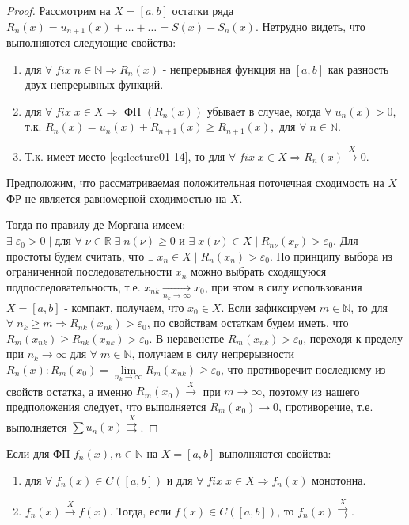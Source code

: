 \begin{proof}
	Рассмотрим на $X = [a,b]$ остатки ряда $R_n(x) = u_{n+1}(x) + \ldots + \ldots = S(x) - S_n(x)$.	Нетрудно видеть, что выполняются следующие свойства:
	\begin{enumerate}
		\item для $\forall \; fix \; n \in \mathbb{N} \Rightarrow R_n (x)$ - непрерывная функция на $[a,b]$ как разность двух непрерывных функций.
		\item для $\forall \; fix \; x \in X \Rightarrow$ $\text{ФП}$ $(R_n(x))$ убывает в случае, когда $\forall \; u_n (x) > 0$, т.к. \newline $R_n(x) = u_n(x) + R_{n+1}(x) \geqslant R_{n+1}(x), \text{ для } \forall \; n \in \mathbb{N}$.
		\item Т.к. имеет место \eqref{eq:lecture01-14}, то для $\forall \; fix \; x \in X \Rightarrow R_n(x) \overset{X}{\to} 0$.
	\end{enumerate}
	Предположим, что рассматриваемая положительная поточечная сходимость на $X$ ФР не является равномерной сходимостью на $X$.

	Тогда по правилу де Моргана имеем: $\exists \; \varepsilon_0 > 0 \; | \; \text{для } \forall \; \nu \in \mathbb{R} \; \exists \; n (\nu) \geqslant 0 \text{ и } \exists \; x (\nu) \in X \; | \; R_{n \nu} (x_\nu) > \varepsilon_0$. Для простоты будем считать, что $\exists \; x_n \in X \; | \; R_n (x_n) > \varepsilon_0$. По принципу выбора из ограниченной последовательности $x_n$ можно выбрать сходящуюся подпоследовательность, т.е. $x_{nk} \underset{n_k \to \infty}{\longrightarrow} x_0$, при этом в силу использования $X = [a,b]$ - компакт, получаем, что $x_0 \in X$. Если зафиксируем $m \in \mathbb{N}$, то для $\forall \; n_k \geqslant m \Rightarrow R_{nk} 	(x_{nk}) > \varepsilon_0$, по свойствам остаткам будем иметь, что $R_{m} (x_{nk}) \geqslant R_{nk} (x_{nk}) > \varepsilon_0$. В неравенстве $R_m (x_{nk}) > \varepsilon_0$, переходя к пределу при $n_k \to \infty \; \text{для } \forall \; m \in \mathbb{N}$, получаем в силу непрерывности $R_n(x): R_m (x_0) = \lim\limits_{n_k \to \infty} R_m(x_{nk}) \geqslant \varepsilon_0$, что противоречит последнему из свойств остатка, а именно $R_m(x_0) \overset{X}{\longrightarrow}$ при $m \to \infty$, поэтому из нашего предположения следует, что выполняется $R_m(x_0) \to 0$, противоречие, т.е. выполняется $\sum u_n(x) \overset{X}{\rightrightarrows}$.
\end{proof}
\begin{consequence}
	Если для ФП $f_n(x), n \in \mathbb{N}$ на $X = [a,b]$ выполняются свойства:
	\begin{enumerate}
		\item для $\forall \; f_n(x) \in C([a,b])$ и для	 $\forall \; fix \; x \in X \Rightarrow f_n(x)$ монотонна.
		\item $f_n(x) 	\overset{X}{\longrightarrow}f(x)$. Тогда, если $f(x) \in C([a,b])$, то $f_n(x) \overset{X}{\rightrightarrows}$.
	\end{enumerate}
\end{consequence}
